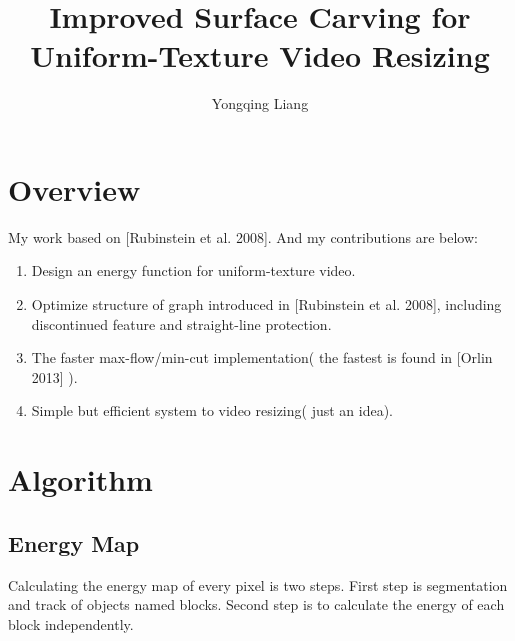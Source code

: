 \documentclass[a4paper, twocolumn]{article}
\author{Yongqing Liang}
\title{Improved Surface Carving for Uniform-Texture Video Resizing}
\begin{document}
	\maketitle
	
	\section{Overview}
	My work based on [Rubinstein et al. 2008]. And my contributions are below:
	\begin{enumerate}[(1)]
		\item Design an energy function for uniform-texture video.
		\item Optimize structure of graph introduced in [Rubinstein et al. 2008], including discontinued feature and straight-line protection. 
		\item The faster max-flow/min-cut implementation( the fastest is found in [Orlin 2013] ).
		\item Simple but efficient system to video resizing( just an idea).
	\end{enumerate}

	\section{Algorithm}
		\subsection{Energy Map}
			Calculating the energy map of every pixel is two steps. First step is segmentation and track of objects named blocks. Second step is to calculate the energy of each block independently.
\end{document}
